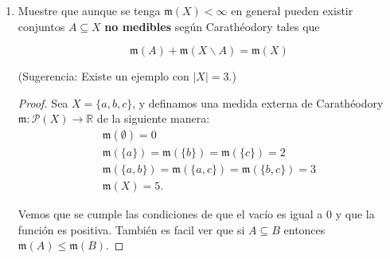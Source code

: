 \documentclass[letter,twoside,12pt]{article}
\numberwithin{equation}{section}
\begin{document}
\begin{enumerate}[label = (\textbf{\arabic*.})]
\begin{enumerate}[label = (\textbf{\roman*.})]
\begin{proof}
Puesto que $A \subseteq B$ tenemos que $X \backslash B \subseteq X \backslash A $ y por lo tanto $[X\backslash A] \cap [X\backslash B] = [X\backslash B]$, es decir que
\begin{equation}
{\mathfrak{m}}([X\backslash A] \cap [X\backslash B] ) = {\mathfrak{m}}(X\backslash B ) \label{eq:cap}
\end{equation}.

Utilizando \eqref{eq:dif} \eqref{eq:medB2} y \eqref{eq:cap} deducimos que \begin{equation}
{\mathfrak{m}}([X\backslash A] \cap B ) = \mathfrak{m}(X\backslash A) - {\mathfrak{m}}([X\backslash A] \cap [X\backslash B] ) = \mathfrak{m}(X\backslash A) -  \mathfrak{m}(X\backslash B) =  0.
\end{equation} 

Así, concluimos que el conjunto  $ [X\backslash A] \cap B$ tiene medida 0 y por lo tanto es $\mathfrak{m}$-medible. Ver \cite[Teorema 10.7]{hewitt}. Por ultimo, puesto que podemos escribir $ A $ como intersección de $ \mathfrak{m}- $medibles, valiendonos de la siguiente expresión,

\begin{equation}
A = B \cap ([X \backslash A] \cap B)^C
\end{equation}

concluimos que $ A $ es medible.
\end{proof}

\item Muestre que aunque se tenga $ \mathfrak{m}(X) < \infty $ en general pueden existir conjuntos $ A \subseteq X $ \textbf{no medibles} según Carathéodory tales que

$$ \mathfrak{m}(A) + \mathfrak{m}(X \backslash A) = \mathfrak{m}(X) $$

(Sugerencia: Existe un ejemplo con $ |X| = 3 $.)
\begin{proof}
Sea $ X = \{a,b,c\}$, y definamos una medida externa de Carathéodory $\mathfrak{m}: \mathcal{P}(X) \rightarrow \mathbb{R}$ de la siguiente manera:
\begin{eqnarray*}
\mathfrak{m}(\emptyset) = 0
\\ \mathfrak{m}(\{a\}) = \mathfrak{m}(\{b\}) = \mathfrak{m}(\{c\}) = 2
\\ \mathfrak{m}(\{a,b\}) = \mathfrak{m}(\{a,c\}) = \mathfrak{m}(\{b,c\}) = 3
\\ \mathfrak{m}(X)=5.
\end{eqnarray*}

Vemos que se cumple las condiciones de que el vacío es igual a 0 y que la función es positiva. También es facil ver que si $A \subseteq B$ 
entonces $\mathfrak{m}(A) \leq \mathfrak{m}(B)$.


\end{proof}
\end{enumerate}
\end{enumerate}
\end{document}
